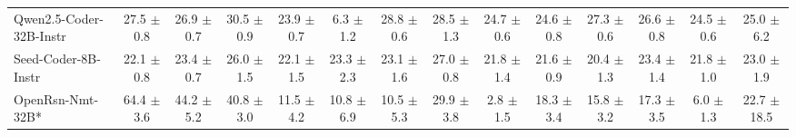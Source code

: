 \begin{table}[t]
{\begin{tabular}{l *{13}{c}}


Qwen2.5-Coder-32B-Instr &
 27.5 {\tiny$\pm$ 0.8} &	
 26.9 {\tiny$\pm$ 0.7} &	
 30.5 {\tiny$\pm$ 0.9} & 
 23.9 {\tiny$\pm$ 0.7} & 
 6.3 {\tiny$\pm$ 1.2} &
 28.8 {\tiny$\pm$ 0.6} &	
 28.5 {\tiny$\pm$ 1.3} &	
 24.7 {\tiny$\pm$ 0.6} &	
 24.6 {\tiny$\pm$ 0.8} &	
 27.3 {\tiny$\pm$ 0.6} &	
 26.6 {\tiny$\pm$ 0.8} &
 24.5 {\tiny$\pm$ 0.6} &	
 25.0 {\tiny$\pm$ 6.2} \\


\rowcolor{gray!10}
Seed-Coder-8B-Instr 
 & 22.1 {\tiny$\pm$ 0.8} & 
 23.4 {\tiny$\pm$ 0.7} & 
 26.0 {\tiny$\pm$ 1.5} & 
 22.1 {\tiny$\pm$ 1.5} & 
 23.3 {\tiny$\pm$ 2.3} & 
 23.1 {\tiny$\pm$ 1.6} & 
 27.0 {\tiny$\pm$ 0.8} & 
 21.8 {\tiny$\pm$ 1.4} & 
 21.6 {\tiny$\pm$ 0.9} & 
 20.4 {\tiny$\pm$ 1.3} & 
 23.4 {\tiny$\pm$ 1.4} & 
 21.8 {\tiny$\pm$ 1.0} & 
 23.0 {\tiny$\pm$ 1.9} \\



OpenRsn-Nmt-32B* &
64.4 {\tiny$\pm$ 3.6} & 
44.2 {\tiny$\pm$ 5.2} & 
40.8 {\tiny$\pm$ 3.0} & 
11.5 {\tiny$\pm$ 4.2} &
10.8 {\tiny$\pm$ 6.9} & 
10.5 {\tiny$\pm$ 5.3} & 
29.9 {\tiny$\pm$ 3.8} & 
2.8 {\tiny$\pm$ 1.5} &
18.3 {\tiny$\pm$ 3.4} & 
15.8 {\tiny$\pm$ 3.2} & 
17.3 {\tiny$\pm$ 3.5} & 
6.0 {\tiny$\pm$ 1.3} &
22.7 {\tiny$\pm$ 18.5} \\




\end{tabular}}
\end{table}
